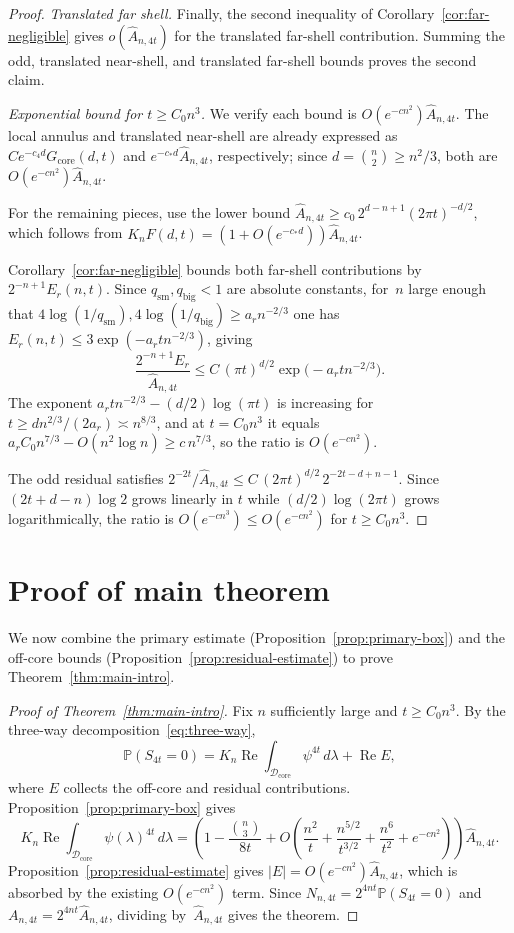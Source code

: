 \documentclass[11pt]{article}
\theoremstyle{definition}
\newcommand{\Prb}{\mathbb{P}}
\newcommand{\corereg}{\mathcal{D}_\mathrm{core}}
\newcommand{\RePart}{\operatorname{Re}}
\newcommand{\core}{G_{\mathrm{core}}}
\newcommand{\Ahat}{\hat A_{n,4t}}
\begin{document}
\begin{proof}
\emph{Translated far shell.}
Finally, the second inequality of Corollary~\ref{cor:far-negligible} gives \(o(\Ahat)\) for the translated far-shell contribution.
Summing the odd, translated near-shell, and translated far-shell bounds proves the second claim.

\emph{Exponential bound for \(t\ge C_0 n^3\).}
We verify each bound is \(O(e^{-cn^2})\Ahat\).
The local annulus and translated near-shell are already expressed as \(Ce^{-c_4 d}\core(d,t)\) and \(e^{-c_*d}\Ahat\), respectively; since \(d=\binom{n}{2}\ge n^2/3\), both are \(O(e^{-cn^2})\Ahat\).

For the remaining pieces, use the lower bound
\(\Ahat\ge c_0\,2^{d-n+1}(2\pi t)^{-d/2}\),
which follows from \(K_nF(d,t)=(1+O(e^{-c_*d}))\Ahat\).

Corollary~\ref{cor:far-negligible} bounds both far-shell contributions by \(2^{-n+1}E_r(n,t)\).
Since \(q_{\mathrm{sm}},q_{\mathrm{big}}<1\) are absolute constants, for~\(n\) large enough that \(4\log(1/q_{\mathrm{sm}}),4\log(1/q_{\mathrm{big}})\ge a_r n^{-2/3}\) one has \(E_r(n,t)\le 3\exp(-a_r t n^{-2/3})\), giving
\[
  \frac{2^{-n+1}E_r}{\Ahat}
  \le C\,(\pi t)^{d/2}\exp\!\bigl(-a_r t n^{-2/3}\bigr).
\]
The exponent \(a_r t n^{-2/3}-(d/2)\log(\pi t)\) is increasing for \(t\ge dn^{2/3}/(2a_r)\asymp n^{8/3}\), and at \(t=C_0 n^3\) it equals \(a_rC_0 n^{7/3}-O(n^2\log n)\ge c\,n^{7/3}\), so the ratio is \(O(e^{-cn^2})\).

The odd residual satisfies \(2^{-2t}/\Ahat\le C\,(2\pi t)^{d/2}\,2^{-2t-d+n-1}\). Since \((2t+d-n)\log 2\) grows linearly in \(t\) while \((d/2)\log(2\pi t)\) grows logarithmically, the ratio is \(O(e^{-cn^3})\le O(e^{-cn^2})\) for \(t\ge C_0n^3\).
\end{proof}

\section{Proof of main theorem}\label{sec:counting}

We now combine the primary estimate (Proposition~\ref{prop:primary-box}) and the off-core bounds (Proposition~\ref{prop:residual-estimate}) to prove Theorem~\ref{thm:main-intro}.

\begin{proof}[Proof of Theorem~\ref{thm:main-intro}]
Fix \(n\) sufficiently large and \(t\ge C_0 n^3\).
By the three-way decomposition~\eqref{eq:three-way},
\[
  \Prb(S_{4t}=0)
  =K_n\RePart\!\int_{\corereg}\psi^{4t}\,d\lambda
  +\RePart E,
\]
where \(E\) collects the off-core and residual contributions.
Proposition~\ref{prop:primary-box} gives
\[
  K_n\RePart\!\int_{\corereg}\psi(\lambda)^{4t}\,d\lambda
  =\left(1-\frac{\binom{n}{3}}{8t}
  +O\!\left(\frac{n^2}{t}+\frac{n^{5/2}}{t^{3/2}}+\frac{n^6}{t^2}+e^{-cn^2}\right)\right)\Ahat.
\]
Proposition~\ref{prop:residual-estimate} gives \(|E|=O(e^{-cn^2})\Ahat\), which is absorbed by the existing \(O(e^{-cn^2})\) term.
Since \(N_{n,4t}=2^{4nt}\Prb(S_{4t}=0)\) and \(A_{n,4t}=2^{4nt}\Ahat\), dividing by~\(\Ahat\) gives the theorem.
\end{proof}
\end{document}
